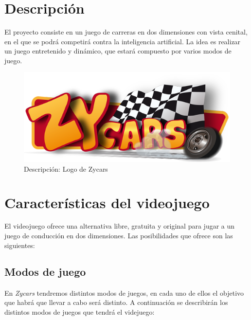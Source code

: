 
\section{Descripción}

\paragraph{}
El proyecto consiste en un juego de carreras en dos dimensiones con vista cenital, en el que se podrá competirá contra la 
inteligencia artificial. 
La idea es realizar un juego entretenido y dinámico, que estará compuesto por varios modos de juego.

\begin{figure}[H]
  \label{logo_zycars}
  \begin{center}
    \includegraphics[scale=0.5]{imagenes/logo_zycars.png}
  \end{center}
  \caption{Descripción: Logo de Zycars}
\end{figure}

\section{Características del videojuego}

\paragraph{}
El videojuego ofrece una alternativa libre, gratuita y original para jugar a un juego de conducción en dos dimensiones. 
Las posibilidades que ofrece son las siguientes:

\subsection{Modos de juego}

\paragraph{}
En \emph{Zycars} tendremos distintos modos de juegos, en cada uno de ellos el
objetivo que habrá que llevar a cabo será distinto.
A continuación se describirán los distintos modos de juegos que tendrá el videjuego:

